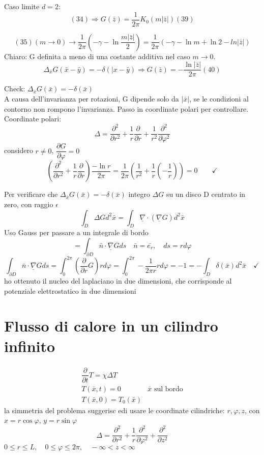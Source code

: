 \documentclass[a4paper,11pt]{report}
\newcommand{\x}{\bar{x}}
\newcommand{\y}{\bar{y}}
\newcommand{\z}{\bar{z}}
\begin{document}
Caso limite $d=2$:
\begin{equation}
(34)\Rightarrow G(\z)=\dfrac{1}{2\pi}K_0(m|\z|) (39)
\end{equation}

$$
(35) (m\to 0)\rightarrow \dfrac{1}{2\pi}\left(-\gamma -\ln \dfrac{m|\z|}{2}\right)=\dfrac{1}{2\pi}(-\gamma -\ln m + \ln 2 - ln|\z|)
$$
Chiaro: G definita a meno di una costante additiva nel caso $m\to 0$.
\begin{equation}
\Delta_{\x}G(\x-\y)=-\delta(|x-\y) \Rightarrow G(\z)=-\dfrac{\ln |\z|}{2\pi} (40)
\end{equation}

Check: $\Delta_{\x}G(\x)=-\delta(\x)$\\
A causa dell'invarianza per rotazioni, G dipende solo da $|\x|$, se le condizioni al contorno non rompono l'invarianza. Passo in coordinate polari per controllare.\\
Coordinate polari:
$$
\Delta =\dfrac{\partial^2}{\partial r^2}+\dfrac{1}{r}\dfrac{\partial}{\partial r}+\dfrac{1}{r^2}\dfrac{\partial ^2}{\partial \varphi^2}
$$
considero $r\neq 0$, $\dfrac{\partial G}{\partial \varphi}=0$
$$
\left(\dfrac{\partial^2}{\partial r^2}+\dfrac{1}{r}\dfrac{\partial}{\partial r}\right)\dfrac{-\ln r}{2\pi}=\dfrac{1}{2\pi}\left(\dfrac{1}{r^2} + \dfrac{1}{r}\left(-\dfrac{1}{r}\right)\right)=0\qquad \checkmark
$$

Per verificare che $\Delta_{\x}G(\x)=-\delta(\x)$ integro $\Delta G$ su un disco D centrato in zero, con raggio $\epsilon$
$$
\int_D \Delta G d^2\x=\int_D \underline{\nabla}\cdot(\underline{\nabla}G)d^2\x
$$
Uso Gauss per passare a un integrale di bordo
$$
=\int_{\partial D} \bar{n} \cdot \underline{\nabla}G ds \quad \bar{n}=\bar{e_r}, \quad ds=rd\varphi
$$
$$
\int_{\partial D}\bar{n}\cdot \underline{\nabla}G ds=\int_{0}^{2\pi}\left(\dfrac{\partial}{\partial r}G\right)rd\varphi=\int_0^{2\pi}-\dfrac{1}{2\pi r}r d\varphi =-1 =-\int_D \delta(\x)d^2\x \quad \checkmark
$$
ho ottenuto il nucleo del laplaciano in due dimensioni, che corrisponde al potenziale elettrostatico in due dimensioni
\section{Flusso di calore in un cilindro infinito}
$$
\begin{matrix}
\dfrac{\partial}{\partial t}T=\chi\Delta T \\
T(\x,t)=0 & \x\text{ sul bordo}\\
T(\x,0)=T_0(\x)
\end{matrix}
$$
la simmetria del problema suggerisc edi usare le coordinate cilindriche: $r,\varphi,z$, con $x=r\cos \varphi$, $y=r\sin \varphi$
$$
\Delta = \dfrac{\partial ^2}{\partial r^2} +\dfrac{1}{r}\dfrac{\partial^2}{\partial \varphi ^2} + \dfrac{\partial ^2}{\partial z^2}
$$
$0\leq r \leq L, \quad 0\leq \varphi \leq 2\pi, \quad -\infty <z<\infty$
\end{document}
